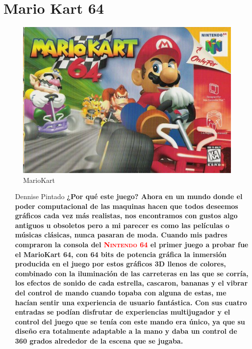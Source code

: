 \section{Mario Kart 64}

\begin{figure}[htbp]
\begin{center}
\includegraphics[width=.60\textwidth]{./imagenes/kart1.jpg}
\caption{MarioKart}
\label{Mario Kart}
\end{center}
\end{figure}


\pagecolor{cyan}
\begin{itemize}
\item[Dennise Pintado] \textbf {¿Por qué este juego? \textnormal {Ahora en un mundo donde el poder computacional de las maquinas hacen que todos deseemos  gráficos cada vez más realistas, nos encontramos con gustos algo antiguos u obsoletos pero a mi parecer es como las películas o músicas clásicas, nunca pasaran de moda. Cuando mis padres compraron la consola del  \textcolor{red}{\textsc{Nintendo 64}}} \textnormal {el primer juego a probar fue el MarioKart 64,  con  64 bits de potencia gráfica la inmersión producida en el juego  por estos gráficos 3D llenos de colores, combinado con la iluminación de las carreteras en las que se corría, los efectos de sonido de cada estrella, cascaron, bananas  y el vibrar del control de mando cuando topaba con alguna de estas, me hacían sentir una experiencia de usuario fantástica. Con sus cuatro entradas se podían disfrutar de experiencias multijugador y el  control del juego que se tenía con este  mando era único, ya que su diseño era totalmente adaptable a la mano y daba un control de 360 grados alrededor de la escena que se jugaba.}}

\end{itemize}